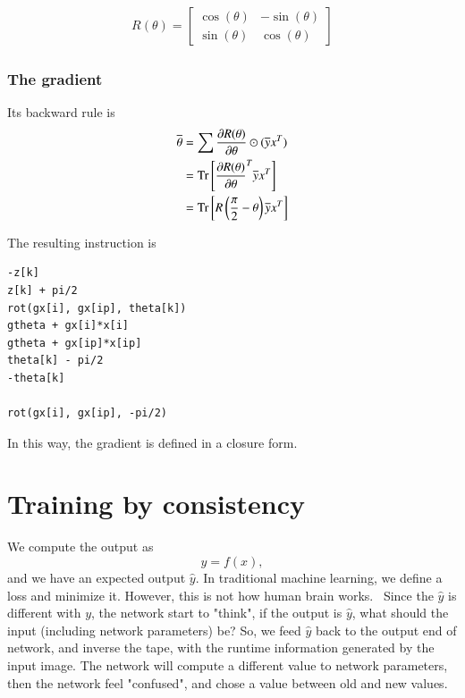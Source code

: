 \documentclass{article}
\newcommand{\<}{\langle}
\renewcommand{\>}{\rangle}
\newcommand{\Tr}{{\rm Tr}}
\begin{document}
\begin{align}
    R(\theta)  = \begin{bmatrix}
        \cos(\theta) & - \sin(\theta)\\
        \sin(\theta)  & \cos(\theta)
    \end{bmatrix}
\end{align}

\subsubsection{The gradient}

Its backward rule is
\begin{align}
    \begin{split}
    \overline{\theta}  &= \sum\frac{\partial R(\theta)}{\partial \theta}\odot(\overline{y}x^T)\\
    &= \Tr\left[\frac{\partial R(\theta)}{\partial \theta}^T\overline{y}x^T\right]\\
    &= \Tr\left[R\left(\frac{\pi}{2}-\theta\right)\overline{y}x^T\right]
    \end{split}
\end{align}

The resulting instruction is

\begin{minipage}{.44\textwidth}
\begin{lstlisting}[basicstyle=\small\ttfamily,columns=fullflexible]
-z[k]
z[k] + pi/2
rot(gx[i], gx[ip], theta[k])
gtheta + gx[i]*x[i]
gtheta + gx[ip]*x[ip]
theta[k] - pi/2
-theta[k]

rot(gx[i], gx[ip], -pi/2)
\end{lstlisting}
\end{minipage}

In this way, the gradient is defined in a closure form.

\section{Training by consistency}
We compute the output as
\begin{equation}
    y = f(x),
\end{equation}
and we have an expected output $\hat{y}$. In traditional machine learning, we define a loss and minimize it. However, this is not how human brain works.~\cite{Hintoncomment}
Since the $\hat{y}$ is different with $y$, the network start to "think", if the output is $\hat{y}$, what should the input (including network parameters) be?
So, we feed $\hat{y}$ back to the output end of network, and inverse the tape, with the runtime information generated by the input image. The network will compute a different value to network parameters, then the network feel "confused", and chose a value between old and new values.
\end{document}
